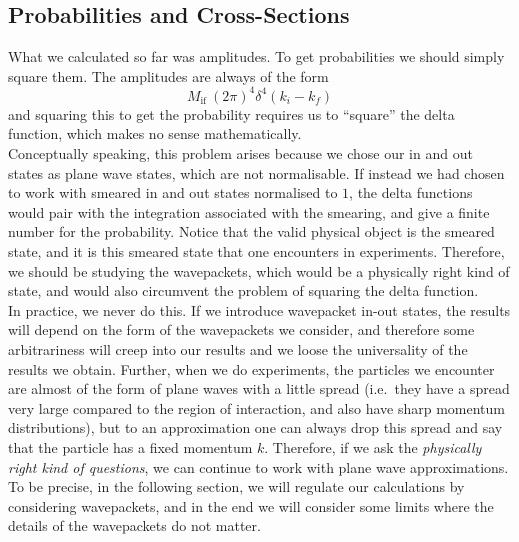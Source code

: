 \documentclass[11pt]{article}
\numberwithin{equation}{section}
\begin{document}
    \subsection{Probabilities and Cross-Sections}

    What we calculated so far was amplitudes. To get probabilities we should simply square them. The amplitudes are always of the form 
    \begin{equation*}
        M_{\text{if}}~ (2\pi)^4\delta^4(k_i - k_f)
    \end{equation*}
    and squaring this to get the probability requires us to ``square'' the delta function, which makes no sense mathematically.\\
    
    Conceptually speaking, this problem arises because we chose our in and out states as plane wave states, which are not normalisable. If instead we had chosen to work with smeared in and out states normalised to \(1\), the delta functions would pair with the integration associated with the smearing, and give a finite number for the probability. Notice that the valid physical object is the smeared state, and it is this smeared state that one encounters in experiments. Therefore, we should be studying the wavepackets, which would be a physically right kind of state, and would also circumvent the problem of squaring the delta function.\\

    In practice, we never do this. If we introduce wavepacket in-out states, the results will depend on the form of the wavepackets we consider, and therefore some arbitrariness will creep into our results and we loose the universality of the results we obtain. Further, when we do experiments, the particles we encounter are almost of the form of plane waves with a little spread (i.e.\ they have a spread very large compared to the region of interaction, and also have sharp momentum distributions), but to an approximation one can always drop this spread and say that the particle has a fixed momentum \(k\). Therefore, if we ask the \textit{physically right kind of questions}, we can continue to work with plane wave approximations. \\
    
    To be precise, in the following section, we will regulate our calculations by considering wavepackets, and in the end we will consider some limits where the details of the wavepackets do not matter. \\
\end{document}
